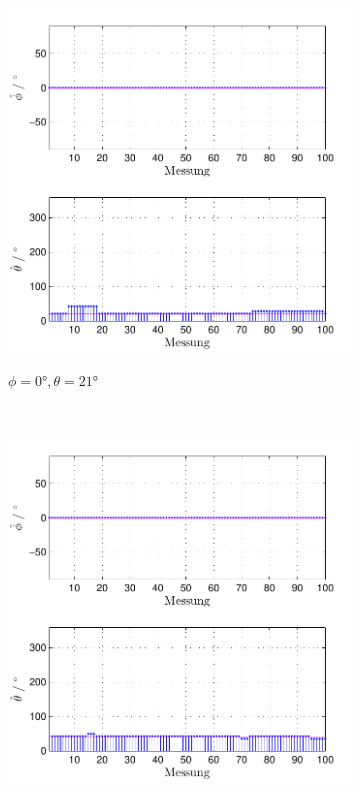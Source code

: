 \begin{figure}
        \centering
        \begin{subfigure}[b]{0.48\textwidth}
                \centering
                \includegraphics[width=\textwidth]{images/04_Echtzeitversuch/MALE_Phi_0_Theta_21}
                \label{fig:Foto_DSP_Draufsicht_Seitanansicht}
                \caption{$\phi=0°, \theta = 21°$}
        \end{subfigure}
        ~ %
        \begin{subfigure}[b]{0.48\textwidth}
                \centering
                \includegraphics[width=\textwidth]{images/04_Echtzeitversuch/MALE_Phi_0_Theta_42}

\end{subfigure}
\end{figure}

